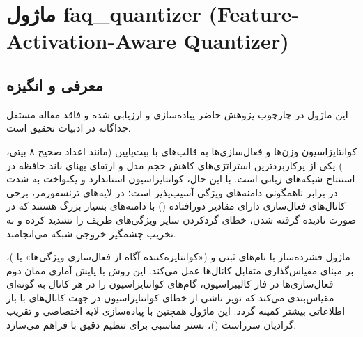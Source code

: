 \section{ماژول faq\_quantizer (Feature-Activation-Aware Quantizer)}
\label{sec:module_faq_quantizer}

\subsection{معرفی و انگیزه}
این ماژول در چارچوب پژوهش حاضر پیاده‌سازی و ارزیابی شده و فاقد مقاله مستقل جداگانه در ادبیات تحقیق است.

کوانتایزاسیون وزن‌ها و فعال‌سازی‌ها به قالب‌های با بیت‌پایین (مانند اعداد صحیح ۸ بیتی، ) یکی از پرکاربردترین استراتژی‌های کاهش حجم مدل و ارتقای پهنای باند حافظه در استنتاج شبکه‌های زبانی است. با این حال، کوانتایزاسیون استاندارد و یکنواخت به شدت در برابر ناهمگونی دامنه‌های ویژگی آسیب‌پذیر است؛ در لایه‌های ترنسفورمر، برخی کانال‌های فعال‌سازی دارای مقادیر دورافتاده () با دامنه‌های بسیار بزرگ هستند که در صورت نادیده گرفته شدن، خطای گردکردن سایر ویژگی‌های ظریف را تشدید کرده و به تخریب چشمگیر خروجی شبکه می‌انجامند.

ماژول فشرده‌ساز  با نام‌های ثبتی  و  («کوانتایزه‌کننده آگاه از فعال‌سازی ویژگی‌ها» یا )، بر مبنای مقیاس‌گذاری متقابل کانال‌ها عمل می‌کند. این روش با پایش آماری ممان دوم فعال‌سازی‌ها در فاز کالیبراسیون، گام‌های کوانتایزاسیون را در هر کانال به گونه‌ای مقیاس‌بندی می‌کند که نویز ناشی از خطای کوانتایزاسیون در جهت کانال‌های با بار اطلاعاتی بیشتر کمینه گردد. این ماژول همچنین با پیاده‌سازی لایه اختصاصی  و تقریب گرادیان سرراست ()، بستر مناسبی برای تنظیم دقیق با  فراهم می‌سازد.

